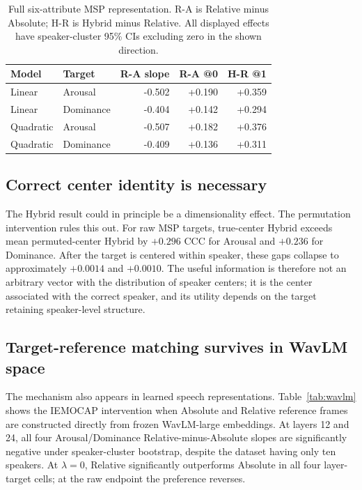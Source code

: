 \documentclass[11pt]{article}
\begin{document}
\begin{table}[t]
\centering
\small
\setlength{\tabcolsep}{3pt}
\begin{tabular}{llrrr}
\toprule
Model & Target & R-A slope & R-A @0 & H-R @1\\
\midrule
Linear & Arousal & -0.502 & +0.190 & +0.359\\
Linear & Dominance & -0.404 & +0.142 & +0.294\\
Quadratic & Arousal & -0.507 & +0.182 & +0.376\\
Quadratic & Dominance & -0.409 & +0.136 & +0.311\\
\bottomrule
\end{tabular}
\caption{Full six-attribute MSP representation. R-A is Relative minus Absolute; H-R is Hybrid minus Relative. All displayed effects have speaker-cluster 95\% CIs excluding zero in the shown direction.}
\label{tab:fullprosody}
\end{table}

\subsection{Correct center identity is necessary}

The Hybrid result could in principle be a dimensionality effect.
The permutation intervention rules this out.
For raw MSP targets, true-center Hybrid exceeds mean permuted-center Hybrid by $+0.296$ CCC for Arousal and $+0.236$ for Dominance.
After the target is centered within speaker, these gaps collapse to approximately $+0.0014$ and $+0.0010$.
The useful information is therefore not an arbitrary vector with the distribution of speaker centers; it is the center associated with the correct speaker, and its utility depends on the target retaining speaker-level structure.

\subsection{Target-reference matching survives in WavLM space}

The mechanism also appears in learned speech representations.
Table~\ref{tab:wavlm} shows the IEMOCAP intervention when Absolute and Relative reference frames are constructed directly from frozen WavLM-large embeddings.
At layers 12 and 24, all four Arousal/Dominance Relative-minus-Absolute slopes are significantly negative under speaker-cluster bootstrap, despite the dataset having only ten speakers.
At $\lambda=0$, Relative significantly outperforms Absolute in all four layer-target cells; at the raw endpoint the preference reverses.
\end{document}
